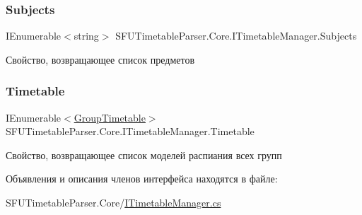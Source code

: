 \subsubsection{\texorpdfstring{Subjects}{Subjects}}
{\footnotesize\ttfamily I\+Enumerable$<$string$>$ S\+F\+U\+Timetable\+Parser.\+Core.\+I\+Timetable\+Manager.\+Subjects\hspace{0.3cm}{\ttfamily [get]}}

Свойство, возвращающее список предметов \mbox{\label{interface_s_f_u_timetable_parser_1_1_core_1_1_i_timetable_manager_ac092d73b1bfbbc5b5f1f50cb2234d622}} 
\subsubsection{\texorpdfstring{Timetable}{Timetable}}
{\footnotesize\ttfamily I\+Enumerable$<$\hyperlink{class_s_f_u_timetable_parser_1_1_core_1_1_entities_1_1_group_timetable}{Group\+Timetable}$>$ S\+F\+U\+Timetable\+Parser.\+Core.\+I\+Timetable\+Manager.\+Timetable\hspace{0.3cm}{\ttfamily [get]}}

Свойство, возвращающее список моделей распиания всех групп 

Объявления и описания членов интерфейса находятся в файле\+:\begin{DoxyCompactItemize}
\item 
S\+F\+U\+Timetable\+Parser.\+Core/\hyperlink{_i_timetable_manager_8cs}{I\+Timetable\+Manager.\+cs}\end{DoxyCompactItemize}
